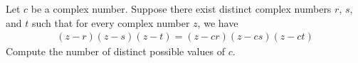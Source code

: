 Let $c$ be a complex number. Suppose there exist distinct complex numbers $r$, $s$, and $t$ such that for every complex number $z$, we have
\begin{align*}
(z-r) (z-s) (z-t) = (z-cr)(z-cs)(z-ct)
\end{align*}
Compute the number of distinct possible values of $c$.